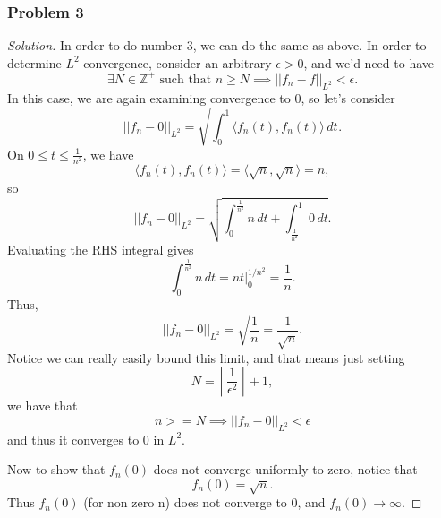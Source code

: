 \documentclass[11pt]{article}
\newcommand{\1}{\mathbf{1}}
\theoremstyle{definition}
\newenvironment{solution}{\begin{proof}[Solution]}{\end{proof}}
\begin{document}
\subsubsection*{Problem 3}
\begin{solution}
In order to do number 3, we can do the same as above. In order to determine \(L^2\)
convergence, consider an arbitrary \(\epsilon > 0\), and we'd need to have 
\[
\exists N \in \mathbb{Z}^{+} \text{ such that } n \ge N \implies ||f_n - f||_{L^2} < \epsilon.
\]
In this case, we are again examining convergence to 0, so let's consider
\[
||f_n - 0||_{L^2}
= \sqrt{\int_{0}^{1} \langle f_n(t),f_n(t)\rangle\,dt}.
\]
On \(0 \leq t \leq \frac{1}{n^2}\), we have
\[
\langle f_n(t),f_n(t)\rangle
= \langle \sqrt{n},\sqrt{n}\rangle
= n,
\]
so
\[
||f_n - 0||_{L^2}
= \sqrt{\int_{0}^{\frac{1}{n^2}} n\,dt
+ \int_{\frac{1}{n^2}}^{1} 0\,dt}.
\]
Evaluating the RHS integral gives
\[
\int_{0}^{\frac{1}{n^2}} n\,dt
= \left.nt\right|_{0}^{1/n^2}
= \frac{1}{n}.
\]
Thus,
\[
||f_n - 0||_{L^2}
= \sqrt{\frac{1}{n}}
= \frac{1}{\sqrt{n}}.
\]
Notice we can really easily bound this limit, and that means just setting
\[
N = \left\lceil \frac{1}{\epsilon^2}\right\rceil + 1,
\]
we have that
\[
n >= N \implies ||f_n - 0||_{L^2} < \epsilon
\]
and thus it converges to 0 in \(L^2\).

Now to show that \(f_n(0)\) does not converge uniformly to zero, notice that
\[
f_n(0) = \sqrt{n}.
\]
Thus \(f_n(0)\) (for non zero n) does not converge to 0, and \(f_n(0) \to \infty\).
\end{solution}
\end{document}
